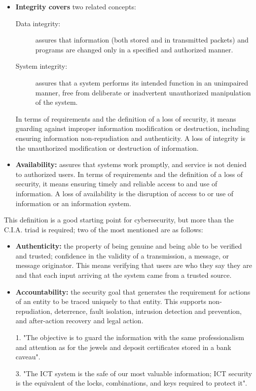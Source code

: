 {\begin{itemize}
    \item \textbf{Integrity covers} two related concepts:
    \begin{description}
        \item [Data integrity:] assures that information (both stored and in transmitted packets) and programs are changed only in a specified and authorized manner.
        \item [System integrity:] assures that a system performs its intended function in an unimpaired manner, free from deliberate or inadvertent unauthorized manipulation of the system.
    \end{description}
    In terms of requirements and the definition of a loss of security, it means guarding against improper information modification or destruction, including ensuring information non-repudiation and authenticity. A loss of integrity is the unauthorized modification or destruction of information.

    \item \textbf{Availability:} assures that systems work promptly, and service is not denied to authorized users. In terms of requirements and the definition of a loss of security, it means ensuring timely and reliable access to and use of information. A loss of availability is the disruption of access to or use of information or an information system.
  \end{itemize}

  This definition is a good starting point for cybersecurity, but more than the C.I.A. triad is required; two of the most mentioned are as follows:

  \begin{itemize}
    \item \textbf{Authenticity:} the property of being genuine and being able to be verified and trusted; confidence in the validity of a transmission, a message, or message originator. This means verifying that users are who they say they are and that each input arriving at the system came from a trusted source.

    \item \textbf{Accountability:} the security goal that generates the requirement for actions of an entity to be traced uniquely to that entity. This supports non-repudiation, deterrence, fault isolation, intrusion detection and prevention, and after-action recovery and legal action.
  \end{itemize}

  \begin{enumerate}
    \item[1.] "The objective is to guard the information with the same professionalism and attention as for the jewels and deposit certificates stored in a bank caveau".
    \item[3.] "The ICT system is the safe of our most valuable information; ICT security is the equivalent of the locks, combinations, and keys required to protect it".
  \end{enumerate}

}{
}



